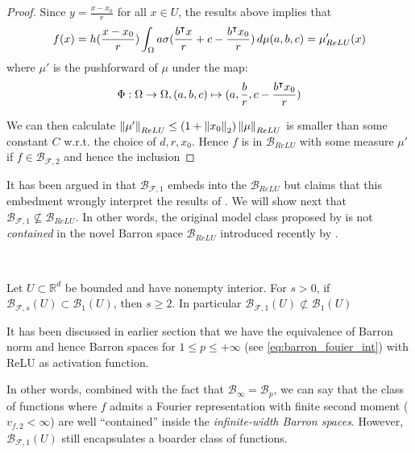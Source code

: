 \begin{proof}
Since $y=\frac{x-x_0}{r}$ for all $x\in U$, the results above implies that 
\begin{equation}
    f(x) = h(\frac{x-x_0}{r}) \int_{\Omega} a 
    \sigma(\frac{b{}^{\intercal} x}{r} + c - \frac{b{}^{\intercal} x_0}{r})\,d\mu(a,b,c)
    = \mu'_{ReLU}(x)
\end{equation}
where $\mu'$ is the pushforward of $\mu$ under the map:
\begin{equation}
    \Phi: \Omega \to \Omega, (a,b,c) \mapsto (a, \frac{b}{r}, c - \frac{b{}^{\intercal} x_0}{r})
\end{equation}

We can then calculate $\left\| \mu' \right\|_{ReLU} \leq (1+\left\| x_0 \right\|_2)
\left\| \mu \right\|_{ReLU}$ is smaller than some constant $C$ w.r.t. the choice of
$d,r,x_0$. Hence $f$ is in $\mathcal{B}_{ReLU}$ with some measure $\mu'$ if $f
\in \mathcal{B}_{\mathcal{F},2}$ and hence the inclusion

\end{proof}

It has been argued in \cite{eRepresentationFormulasPointwise2020} that
$\mathcal{B}_{\mathcal{F},1}$ embeds into the $\mathcal{B}_{ReLU}$ but
\cite{carageaNeuralNetworkApproximation2022} claims that this embedment wrongly
interpret the results of
\cite{barronUniversalApproximationBounds1993,barronNeuralNetApproximation1992}.
We will show next that $\mathcal{B}_{\mathcal{F},1}\not\subseteq
\mathcal{B}_{ReLU}$. In other words, the original model class proposed by
\cite{barronNeuralNetApproximation1992} is not \textit{contained} in the novel
Barron space $\mathcal{B}_{ReLU}$ introduced recently by
\cite{eBarronSpaceFlowinduced2021}. 


\begin{theorem}~\cite[Proposition 7.4]{carageaNeuralNetworkApproximation2022}

    Let $U \subset \mathbb{R}^d$ be bounded and have nonempty interior. For
    $s>0$, if $\mathcal{B}_{\mathcal{F},s}(U) \subset \mathcal{B}_{1}(U)$, then
    $s \geq 2$. In particular $\mathcal{B}_{\mathcal{F},1}(U) \not\subset
        \mathcal{B}_{1}(U)$
\end{theorem}

\begin{remark}
    It has been discussed in earlier section that we have the equivalence of
    Barron norm and hence Barron spaces for $1 \leq p\leq +\infty$ (see
    \eqref{eq:barron_fouier_int}) with ReLU as activation function.

    In other words, combined with the fact that
    $\mathcal{B}_{\infty}=\mathcal{B}_p$, we can say that the class of functions
    where $f$ admits a Fourier representation with finite second moment ($v_{f,
    2} < \infty$) are well ``contained'' inside the \textit{infinite-width
    Barron spaces}. However, $\mathcal{B}_{\mathcal{F}, 1}(U)$ still
    encapsulates a boarder class of functions.
\end{remark}



